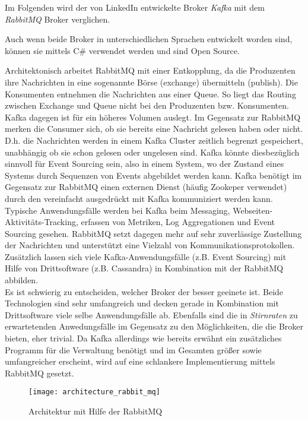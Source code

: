 {Im Folgenden wird der von LinkedIn entwickelte Broker \textit{Kafka} mit dem \textit{RabbitMQ} Broker verglichen. 

Auch wenn beide Broker in unterschiedlichen Sprachen entwickelt worden sind, können sie mittels C\# verwendet werden und sind Open Source.

Architektonisch arbeitet RabbitMQ mit einer Entkopplung, da die Produzenten ihre Nachrichten in eine sogenannte Börse (exchange) übermitteln (publish). Die Konsumenten entnehmen die Nachrichten aus einer Queue. So liegt das Routing zwischen Exchange und Queue nicht bei den Produzenten bzw. Konsumenten. Kafka dagegen ist für ein höheres Volumen auslegt. Im Gegensatz zur RabbitMQ merken die Consumer sich, ob sie bereits eine Nachricht gelesen haben oder nicht. D.h. die Nachrichten werden in einem Kafka Cluster zeitlich begrenzt gespeichert, unabhängig ob sie schon gelesen oder ungelesen sind. Kafka könnte diesbezüglich sinnvoll für Event Sourcing sein, also in einem System, wo der Zustand eines Systems durch Sequenzen von Events abgebildet werden kann.\cite{richardson2019mic_pattern} Kafka benötigt im Gegensatz zur RabbitMQ einen externen Dienst (häufig Zookeper verwendet) durch den vereinfacht ausgedrückt mit Kafka kommuniziert werden kann.\cite{understandingRabbitMQApacheKafka}\cite{kafkaUseCases} Typische Anwendungsfälle werden bei Kafka beim Messaging, Webseiten-Aktivitäts-Tracking, erfassen von Metriken, Log Aggregationen und Event Sourcing gesehen.\cite{kafkaUseCases} RabbitMQ setzt dagegen mehr auf sehr zuverlässige Zustellung der Nachrichten und unterstützt eine Vielzahl von Kommunikationsprotokollen. Zusätzlich lassen sich viele Kafka-Anwendungsfälle (z.B. Event Sourcing) mit Hilfe von Drittsoftware (z.B. Cassandra) in Kombination mit der RabbitMQ abbilden.\cite{understandingRabbitMQApacheKafka}\\

Es ist schwierig zu entscheiden, welcher Broker der besser geeinete ist. Beide Technologien sind sehr umfangreich und decken gerade in Kombination mit Drittsoftware viele selbe Anwendungsfälle ab. Ebenfalls sind die in \textit{Stirnraten} zu erwartetenden Anwedungsfälle im Gegensatz zu den Möglichkeiten, die die Broker bieten, eher trivial. Da Kafka allerdings wie bereits erwähnt ein zusätzliches Programm für die Verwaltung benötigt und im Gesamten größer sowie umfangreicher erscheint, wird auf eine schlankere Implementierung mittels RabbitMQ gesetzt.\\

\begin{figure}[ht]
	\centering
	\texttt{[image: architecture\_rabbit\_mq]}
	\caption[Architektur mit Hilfe von RabbitMQ] {Architektur mit Hilfe der RabbitMQ}
	\label{fig:architecture_rabbit_mq}
\end{figure}

}
